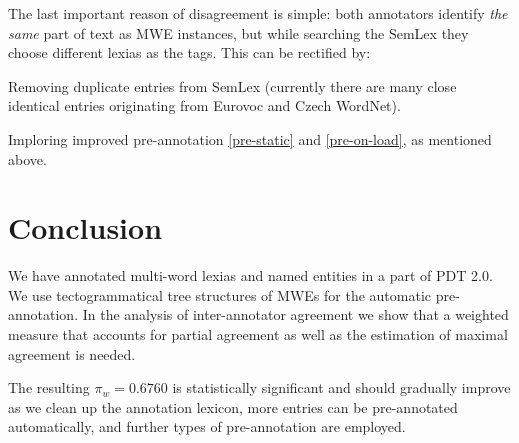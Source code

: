 \documentclass[11pt]{article}
\begin{document}
The last important reason of disagreement is simple: both annotators identify {\em the same} part of text as MWE instances, but while searching the SemLex they choose different lexias as the tags. This can be rectified by:
	\begin{compactitem}
		\item Removing duplicate entries from SemLex (currently there are many close identical entries originating from Eurovoc and Czech WordNet).
		\item Imploring improved pre-annotation \ref{pre-static} and \ref{pre-on-load}, as mentioned above.
	\end{compactitem}




\section{Conclusion}

We have annotated multi-word lexias and named entities in a part of PDT 2.0. We use tectogrammatical tree structures of MWEs for the automatic pre-annotation. In the analysis of inter-annotator agreement we show that a weighted measure that accounts for partial agreement as well as the estimation of maximal agreement is needed. 

The resulting $\pi_w = 0.6760$ is statistically significant and should gradually improve as we clean up the annotation lexicon, more entries can be pre-annotated automatically, and further types of pre-annotation are employed.
\end{document}
